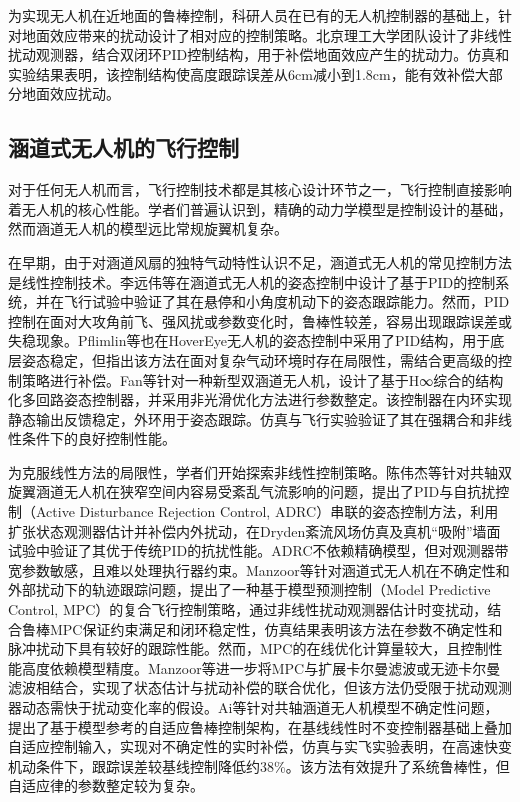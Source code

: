 为实现无人机在近地面的鲁棒控制，科研人员在已有的无人机控制器的基础上，针对地面效应带来的扰动设计了相对应的控制策略。北京理工大学团队设计了非线性扰动观测器，结合双闭环PID控制结构，用于补偿地面效应产生的扰动力。仿真和实验结果表明，该控制结构使高度跟踪误差从6cm减小到1.8cm，能有效补偿大部分地面效应扰动\cite{ai2020aerodynamic}。

\subsection{涵道式无人机的飞行控制}
对于任何无人机而言，飞行控制技术都是其核心设计环节之一，飞行控制直接影响着无人机的核心性能。学者们普遍认识到，精确的动力学模型是控制设计的基础，然而涵道无人机的模型远比常规旋翼机复杂。

在早期，由于对涵道风扇的独特气动特性认识不足，涵道式无人机的常见控制方法是线性控制技术。李远伟等在涵道式无人机的姿态控制中设计了基于PID的控制系统，并在飞行试验中验证了其在悬停和小角度机动下的姿态跟踪能力\cite{li2010robust}。然而，PID控制在面对大攻角前飞、强风扰或参数变化时，鲁棒性较差，容易出现跟踪误差或失稳现象。Pflimlin等也在HoverEye无人机的姿态控制中采用了PID结构，用于底层姿态稳定，但指出该方法在面对复杂气动环境时存在局限性，需结合更高级的控制策略进行补偿\cite{pflimlin2007position}。Fan等针对一种新型双涵道无人机，设计了基于H∞综合的结构化多回路姿态控制器，并采用非光滑优化方法进行参数整定。该控制器在内环实现静态输出反馈稳定，外环用于姿态跟踪。仿真与飞行实验验证了其在强耦合和非线性条件下的良好控制性能\cite{fan2018modelling}。

为克服线性方法的局限性，学者们开始探索非线性控制策略。陈伟杰等针对共轴双旋翼涵道无人机在狭窄空间内容易受紊乱气流影响的问题，提出了PID与自抗扰控制（Active Disturbance Rejection Control, ADRC）串联的姿态控制方法，利用扩张状态观测器估计并补偿内外扰动，在Dryden紊流风场仿真及真机“吸附”墙面试验中验证了其优于传统PID的抗扰性能\cite{chen2024ADRC}。ADRC不依赖精确模型，但对观测器带宽参数敏感，且难以处理执行器约束。Manzoor等针对涵道式无人机在不确定性和外部扰动下的轨迹跟踪问题，提出了一种基于模型预测控制（Model Predictive Control, MPC）的复合飞行控制策略，通过非线性扰动观测器估计时变扰动，结合鲁棒MPC保证约束满足和闭环稳定性，仿真结果表明该方法在参数不确定性和脉冲扰动下具有较好的跟踪性能\cite{Manzoor2020CFC}。然而，MPC的在线优化计算量较大，且控制性能高度依赖模型精度。Manzoor等进一步将MPC与扩展卡尔曼滤波或无迹卡尔曼滤波相结合，实现了状态估计与扰动补偿的联合优化，但该方法仍受限于扰动观测器动态需快于扰动变化率的假设\cite{manzoor2022composite}。Ai等针对共轴涵道无人机模型不确定性问题，提出了基于模型参考的自适应鲁棒控制架构，在基线线性时不变控制器基础上叠加自适应控制输入，实现对不确定性的实时补偿，仿真与实飞实验表明，在高速快变机动条件下，跟踪误差较基线控制降低约38\%\cite{ai2025robust}。该方法有效提升了系统鲁棒性，但自适应律的参数整定较为复杂。

